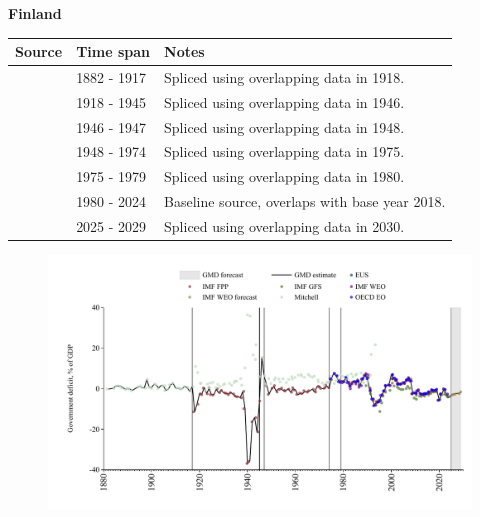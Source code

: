 \documentclass[12pt,a4paper,landscape]{article}
\begin{document}
\begin{adjustbox}{max totalsize={\paperwidth}{\paperheight},center}
\begin{minipage}[t][\textheight][t]{\textwidth}
\vspace*{0.5cm}
{}
\begin{center}
{\Large\bfseries Finland}
\end{center}
\vspace{0.5cm}
\begin{table}[H]
\centering
\small
\begin{tabular}{|l|l|l|}
\hline
\textbf{Source} & \textbf{Time span} & \textbf{Notes} \\
\hline
\rowcolor{white}\cite{Mitchell}& 1882 - 1917 &Spliced using overlapping data in 1918.\\
\rowcolor{lightgray}\cite{IMF_FPP}& 1918 - 1945 &Spliced using overlapping data in 1946.\\
\rowcolor{white}\cite{Mitchell}& 1946 - 1947 &Spliced using overlapping data in 1948.\\
\rowcolor{lightgray}\cite{IMF_FPP}& 1948 - 1974 &Spliced using overlapping data in 1975.\\
\rowcolor{white}\cite{OECD_EO}& 1975 - 1979 &Spliced using overlapping data in 1980.\\
\rowcolor{lightgray}\cite{EUS}& 1980 - 2024 &Baseline source, overlaps with base year 2018.\\
\rowcolor{white}\cite{IMF_WEO_forecast}& 2025 - 2029 &Spliced using overlapping data in 2030.\\
\hline
\end{tabular}
\end{table}
\begin{figure}[H]
\centering
\includegraphics[width=\textwidth,height=0.6\textheight,keepaspectratio]{graphs/FIN_govdef_GDP.pdf}
\end{figure}
\end{minipage}
\end{adjustbox}
\end{document}
